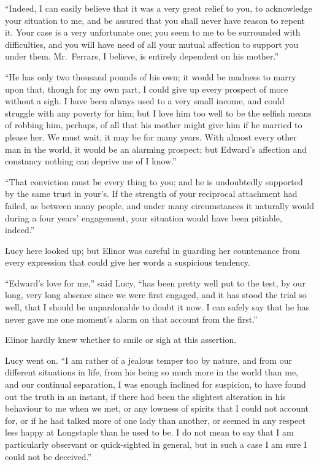 \documentclass{article}
\begin{document}
``Indeed, I can easily believe that it was a very great
relief to you, to acknowledge your situation to me, and be
assured that you shall never have reason to repent it.
Your case is a very unfortunate one; you seem to me to
be surrounded with difficulties, and you will have need
of all your mutual affection to support you under them.
Mr.\ Ferrars, I believe, is entirely dependent on his mother.''

``He has only two thousand pounds of his own; it would
be madness to marry upon that, though for my own part,
I could give up every prospect of more without a sigh.
I have been always used to a very small income, and could
struggle with any poverty for him; but I love him too well
to be the selfish means of robbing him, perhaps, of all that
his mother might give him if he married to please her.
We must wait, it may be for many years.  With almost every
other man in the world, it would be an alarming prospect;
but Edward's affection and constancy nothing can deprive me of
I know.''

``That conviction must be every thing to you;
and he is undoubtedly supported by the same trust in your's.
If the strength of your reciprocal attachment had failed,
as between many people, and under many circumstances
it naturally would during a four years' engagement,
your situation would have been pitiable, indeed.''

Lucy here looked up; but Elinor was careful
in guarding her countenance from every expression
that could give her words a suspicious tendency.

``Edward's love for me,'' said Lucy, ``has been pretty
well put to the test, by our long, very long absence
since we were first engaged, and it has stood the trial
so well, that I should be unpardonable to doubt it now.
I can safely say that he has never gave me one moment's
alarm on that account from the first.''

Elinor hardly knew whether to smile or sigh
at this assertion.

Lucy went on.  ``I am rather of a jealous temper too
by nature, and from our different situations in life,
from his being so much more in the world than me, and our
continual separation, I was enough inclined for suspicion,
to have found out the truth in an instant, if there had been
the slightest alteration in his behaviour to me when we met,
or any lowness of spirits that I could not account for,
or if he had talked more of one lady than another,
or seemed in any respect less happy at Longstaple than he
used to be.  I do not mean to say that I am particularly
observant or quick-sighted in general, but in such a case
I am sure I could not be deceived.''
\end{document}
